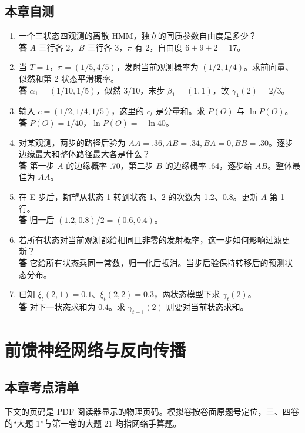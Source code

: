 \documentclass[UTF8,a4paper,zihao=-4,fontset=fandol]{ctexrep}
\begin{document}
\section{本章自测}
\begin{enumerate}
\item 一个三状态四观测的离散 HMM，独立的同质参数自由度是多少？\\
\textbf{答} $A$ 三行各 2，$B$ 三行各 3，$\pi$ 有 2，自由度 $6+9+2=17$。
\item 当 $T=1$，$\pi=(1/5,4/5)$，发射当前观测概率为 $(1/2,1/4)$。求前向量、似然和第 2 状态平滑概率。\\
\textbf{答} $\alpha_1=(1/10,1/5)$，似然 $3/10$，末步 $\beta_1=(1,1)$，故 $\gamma_1(2)=2/3$。
\item 输入 $c=(1/2,1/4,1/5)$，这里的 $c_t$ 是分量和。求 $P(O)$ 与 $\ln P(O)$。\\
\textbf{答} $P(O)=1/40$，$\ln P(O)=-\ln40$。
\item 对某观测，两步的路径后验为 $AA=.36,AB=.34,BA=0,BB=.30$。逐步边缘最大和整体路径最大各是什么？\\
\textbf{答} 第一步 $A$ 的边缘概率 .70，第二步 $B$ 的边缘概率 .64，逐步给 $AB$。整体最佳为 $AA$。
\item 在 E 步后，期望从状态 1 转到状态 1、2 的次数为 1.2、0.8。更新 $A$ 第 1 行。\\
\textbf{答} 归一后 $(1.2,0.8)/2=(0.6,0.4)$。
\item 若所有状态对当前观测都给相同且非零的发射概率，这一步如何影响过滤更新？\\
\textbf{答} 它给所有状态乘同一常数，归一化后抵消。当步后验保持转移后的预测状态分布。
\item 已知 $\xi_t(2,1)=0.1$、$\xi_t(2,2)=0.3$，两状态模型下求 $\gamma_t(2)$。\\
\textbf{答} 对下一状态求和为 $0.4$。求 $\gamma_{t+1}(2)$ 则要对当前状态求和。
\end{enumerate}

\chapter{前馈神经网络与反向传播}

\section{本章考点清单}

下文的页码是 PDF 阅读器显示的物理页码。模拟卷按卷面原题号定位，三、四卷的“大题 1”与第一卷的大题 21 均指网络手算题。
\end{document}
